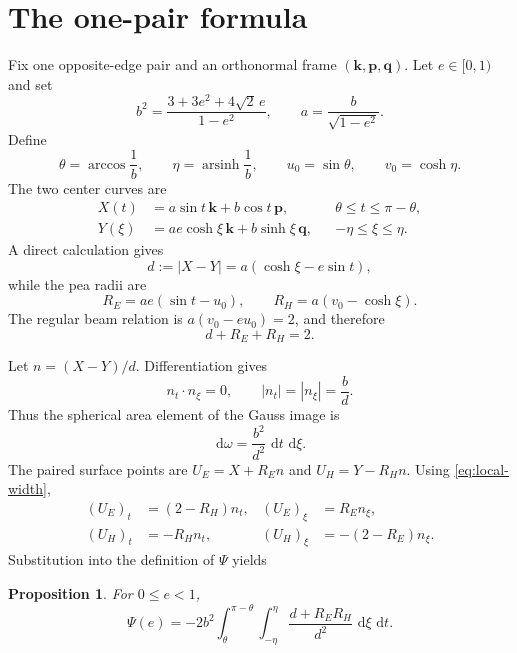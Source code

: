 \documentclass[11pt]{article}
\numberwithin{equation}{section}
\newtheorem{proposition}[theorem]{Proposition}
\theoremstyle{remark}
\newcommand{\dd}{\,\mathrm d}
\newcommand{\arsinh}{\operatorname{arsinh}}
\begin{document}
\section{The one-pair formula}
\label{sec:pair}

Fix one opposite-edge pair and an orthonormal frame \((\mathbf k,\mathbf p,\mathbf q)\). Let \(e\in[0,1)\) and set
\begin{equation}
  b^2=\frac{3+3e^2+4\sqrt2\,e}{1-e^2},
  \qquad
  a=\frac{b}{\sqrt{1-e^2}}.
  \label{eq:ab}
\end{equation}
Define
\[
  \theta=\arccos\frac1b,
  \qquad
  \eta=\arsinh\frac1b,
  \qquad
  u_0=\sin\theta,
  \qquad
  v_0=\cosh\eta.
\]
The two center curves are
\begin{align}
  X(t)&=a\sin t\,\mathbf k+b\cos t\,\mathbf p,
  &&\theta\le t\le\pi-\theta,\label{eq:X}\\
  Y(\xi)&=ae\cosh\xi\,\mathbf k+b\sinh\xi\,\mathbf q,
  &&-\eta\le\xi\le\eta.\label{eq:Y}
\end{align}
A direct calculation gives
\begin{equation}
  d:=|X-Y|=a(\cosh\xi-e\sin t),
  \label{eq:d}
\end{equation}
while the pea radii are
\begin{equation}
  R_E=ae(\sin t-u_0),
  \qquad
  R_H=a(v_0-\cosh\xi).
  \label{eq:radii}
\end{equation}
The regular beam relation is \(a(v_0-eu_0)=2\), and therefore
\begin{equation}
  d+R_E+R_H=2.
  \label{eq:local-width}
\end{equation}

Let \(n=(X-Y)/d\). Differentiation gives
\begin{equation}
  n_t\cdot n_\xi=0,
  \qquad
  |n_t|=|n_\xi|=\frac bd.
  \label{eq:conformal}
\end{equation}
Thus the spherical area element of the Gauss image is
\begin{equation}
  \dd\omega=\frac{b^2}{d^2}\,\dd t\,\dd\xi.
  \label{eq:area-element}
\end{equation}
The paired surface points are \(U_E=X+R_En\) and \(U_H=Y-R_Hn\). Using \eqref{eq:local-width},
\begin{align*}
  (U_E)_t&=(2-R_H)n_t,& (U_E)_\xi&=R_En_\xi,\\
  (U_H)_t&=-R_Hn_t,& (U_H)_\xi&=-(2-R_E)n_\xi.
\end{align*}
Substitution into the definition of \(\Psi\) yields
\begin{proposition}
\label{prop:pair-2d}
For \(0\le e<1\),
\begin{equation}
  \Psi(e)
  =-2b^2
  \int_\theta^{\pi-\theta}
  \int_{-\eta}^{\eta}
  \frac{d+R_ER_H}{d^2}\,\dd\xi\,\dd t.
  \label{eq:psi-2d}
\end{equation}
\end{proposition}
\end{document}
